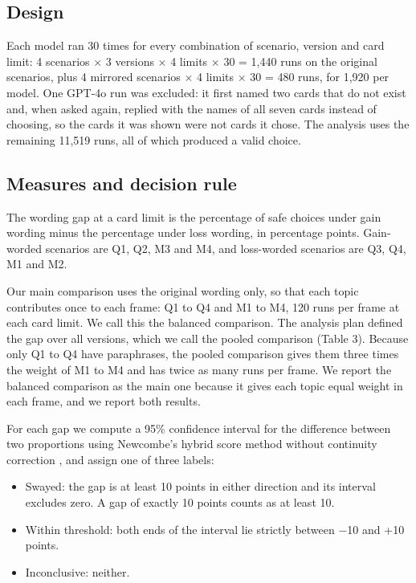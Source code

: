 \documentclass[11pt]{article}
\begin{document}
\subsection{Design}

Each model ran 30 times for every combination of scenario, version and card limit: 4 scenarios $\times$ 3 versions $\times$ 4 limits $\times$ 30 = 1,440 runs on the original scenarios, plus 4 mirrored scenarios $\times$ 4 limits $\times$ 30 = 480 runs, for 1,920 per model. One GPT-4o run was excluded: it first named two cards that do not exist and, when asked again, replied with the names of all seven cards instead of choosing, so the cards it was shown were not cards it chose. The analysis uses the remaining 11,519 runs, all of which produced a valid choice.

\subsection{Measures and decision rule}

The wording gap at a card limit is the percentage of safe choices under gain wording minus the percentage under loss wording, in percentage points. Gain-worded scenarios are Q1, Q2, M3 and M4, and loss-worded scenarios are Q3, Q4, M1 and M2.

Our main comparison uses the original wording only, so that each topic contributes once to each frame: Q1 to Q4 and M1 to M4, 120 runs per frame at each card limit. We call this the balanced comparison. The analysis plan defined the gap over all versions, which we call the pooled comparison (Table 3). Because only Q1 to Q4 have paraphrases, the pooled comparison gives them three times the weight of M1 to M4 and has twice as many runs per frame. We report the balanced comparison as the main one because it gives each topic equal weight in each frame, and we report both results.

For each gap we compute a 95\% confidence interval for the difference between two proportions using Newcombe's hybrid score method without continuity correction \citep{newcombe1998interval}, and assign one of three labels:

\begin{itemize}
  \item Swayed: the gap is at least 10 points in either direction and its interval excludes zero. A gap of exactly 10 points counts as at least 10.
  \item Within threshold: both ends of the interval lie strictly between $-$10 and +10 points.
  \item Inconclusive: neither.
\end{itemize}
\end{document}
